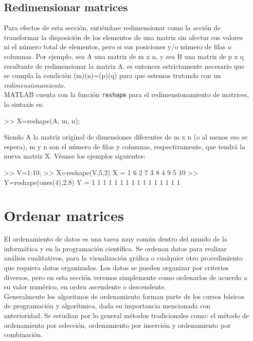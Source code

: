 \subsection{Redimensionar matrices}\label{redimensionar-matrices}

Para efectos de esta sección, entiéndase redimensionar como la acción de
transformar la disposición de los elementos de una matriz sin afectar
sus valores ni el número total de elementos, pero si sus posiciones y/o
número de filas o columnas. Por ejemplo, sea A una matriz de m x n, y
sea B una matriz de p x q resultante de redimensionar la matriz A, es
entonces estrictamente necesario que se cumpla la condición
(m)(n)=(p)(q) para que estemos tratando con un \emph{redimensionamiento}. \\

MATLAB cuenta con la función \texttt{reshape} para el redimensionamiento
de matrices, la sintaxis es:

\begin{matlab}
>> X=reshape(A, m, n);
\end{matlab}

Siendo A la matriz original de dimensiones diferentes de m x n (o al
menos eso se espera), m y n son el número de filas y columnas,
respectivamente, que tendrá la nueva matriz X. Véanse los ejemplos
siguientes:

\begin{matlab}
>> V=1:10;
>> X=reshape(V,5,2)
X =
     1     6
     2     7
     3     8
     4     9
     5    10
>> Y=reshape(ones(4),2,8)
Y =
     1     1     1     1     1     1     1     1
     1     1     1     1     1     1     1     1
\end{matlab}

\section{Ordenar matrices}\label{ordenar-matrices}

El ordenamiento de datos es una tarea muy común dentro del mundo de la
informática y en la programación científica. Se ordenan datos para
realizar análisis cualitativos, para la visualización gráfica o
cualquier otro procedimiento que requiera datos organizados. Los datos
se pueden organizar por criterios diversos, pero en esta sección veremos
simplemente como ordenarlos de acuerdo a su valor numérico, en orden
ascendente o descendente. \\

Generalmente los algoritmos de ordenamiento forman parte de los cursos
básicos de programación y algorítmica, dada su importancia mencionada
con anterioridad. Se estudian por lo general métodos tradicionales como:
el método de ordenamiento por selección, ordenamiento por inserción y
ordenamiento por combinación. \\

